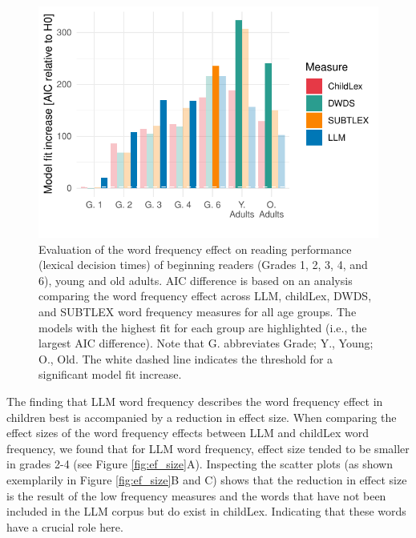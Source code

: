 \documentclass[doc, a4paper]{apa7}
\begin{document}
\begin{figure}[!htbp]
    \centering
    \includegraphics[scale=1]{figures/exp1_modelcomp.pdf}
    \caption{Evaluation of the word frequency effect on reading performance (lexical decision times) of beginning readers (Grades 1, 2, 3, 4, and 6), young and old adults. AIC difference is based on an analysis comparing the word frequency effect across LLM, childLex, DWDS, and SUBTLEX word frequency measures for all age groups. The models with the highest fit for each group are highlighted (i.e., the largest AIC difference). Note that G. abbreviates Grade; Y., Young; O., Old. The white dashed line indicates the threshold for a significant model fit increase.}
\label{fig:modelcomprt}
\end{figure}

The finding that LLM word frequency describes the word frequency effect in children best is accompanied by a reduction in effect size. When comparing the effect sizes of the word frequency effects between LLM and childLex word frequency, we found that for LLM word frequency, effect size tended to be smaller in grades 2-4 (see Figure \ref{fig:ef_size}A). Inspecting the scatter plots (as shown exemplarily in Figure \ref{fig:ef_size}B and C) shows that the reduction in effect size is the result of the low frequency measures and the words that have not been included in the LLM corpus but do exist in childLex. Indicating that these words have a crucial role here.
\end{document}
